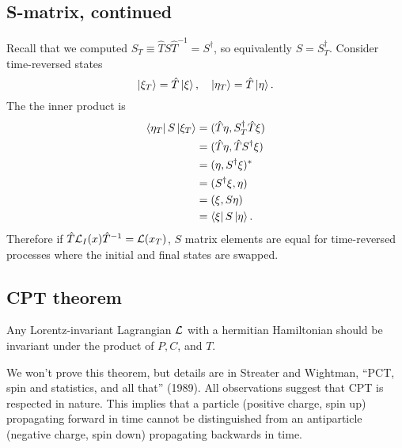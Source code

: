 \subsection*{S-matrix, continued} Recall that we computed $S_T \equiv \hat T S \hat T^{-1}=S^\dagger$, so equivalently $S=S_T^\dagger$. Consider time-reversed states
\begin{equation}
    \left| \xi_T \right>=\hat T \left| \xi \right>, \quad \left| \eta_T \right> = \hat T \left| \eta \right>.
\end{equation}
The the inner product is
\begin{align*}
    \left< \eta_T \right|S \left| \xi_T \right> &= (\hat T \eta, S_T^\dagger \hat T \xi)\\
        &= (\hat T \eta, \hat T S^\dagger \xi)\\
        &=(\eta,S^\dagger \xi)^*\\
        &=(S^\dagger \xi, \eta)\\
        &=(\xi,S \eta)\\
        &= \left< \xi \right|S \left| \eta \right>.
\end{align*}
Therefore if $\hat T \mathcal L_I(x) \hat T^{-1} = \mathcal L (x_T)$, $S$ matrix elements are equal for time-reversed processes where the initial and final states are swapped.

\subsection*{CPT theorem}
\begin{thm}
    Any Lorentz-invariant Lagrangian $\mathcal L$ with a hermitian Hamiltonian should be invariant under the product of $P, C$, and $T.$
\end{thm}
We won't prove this theorem, but details are in Streater and Wightman, ``PCT, spin and statistics, and all that'' (1989). All observations suggest that CPT is respected in nature. This implies that a particle (positive charge, spin up) propagating forward in time cannot be distinguished from an antiparticle (negative charge, spin down) propagating backwards in time.

